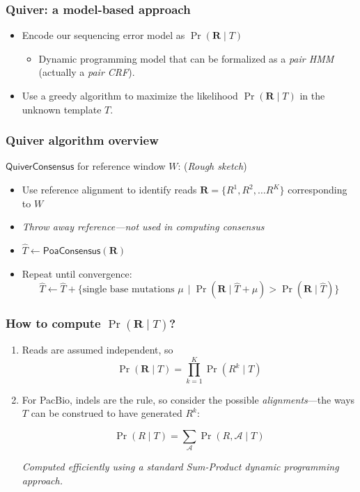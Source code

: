 \documentclass[serif,11pt]{beamer}
\begin{document}
\begin{frame}
\frametitle{Quiver: a model-based approach}
\label{sec-6-4}

\begin{itemize}
\item Encode our sequencing error model as $\Pr(\mathbf{R} \mid T)$
\begin{itemize}
\item Dynamic programming model that can be formalized as a \emph{pair HMM}
       (actually a \emph{pair CRF}).
\end{itemize}
\item Use a greedy algorithm to maximize the likelihood
     $\Pr(\mathbf{R} \mid T)$ in the unknown template $T$.
\end{itemize}
\end{frame}
\begin{frame}
\frametitle{Quiver algorithm overview}
\label{sec-6-5}

   $\mathsf{QuiverConsensus}$ for reference window $W$: (\emph{Rough sketch})
\begin{itemize}
\item Use reference alignment to identify reads $\mathbf{R}=\{R^1, R^2, \ldots R^K\}$
     corresponding to $W$
\item \emph{Throw away reference---not used in computing consensus}
\item $\widehat{T} \leftarrow \mathsf{PoaConsensus}(\mathbf{R})$
\item Repeat until convergence:
     $$\widehat{T} \leftarrow \hat{T} +
     \big\{\text{single base mutations } \mu \, \mid
     \Pr(\mathbf{R} \mid \widehat{T} + \mu) > \Pr(\mathbf{R} \mid \widehat{T}) \big\}$$
\end{itemize}
\end{frame}
\begin{frame}
\frametitle{How to compute $\Pr(\mathbf{R} \mid T)$?}
\label{sec-6-6}


\begin{enumerate}
\item Reads are assumed independent, so
      $$\Pr(\mathbf{R} \mid T) = \prod_{k=1}^{K}\Pr(R^k \mid T)$$
\item For PacBio, indels are the rule, so consider the
      possible \emph{alignments}---the ways $T$ can be construed to
      have generated $R^k$:

      $$\Pr(R \mid T) = \sum_\mathcal{A} \Pr(R, \mathcal{A} \mid T) $$

      \emph{Computed efficiently using a standard Sum-Product dynamic programming approach.}
\end{enumerate}
\end{frame}
\end{document}
